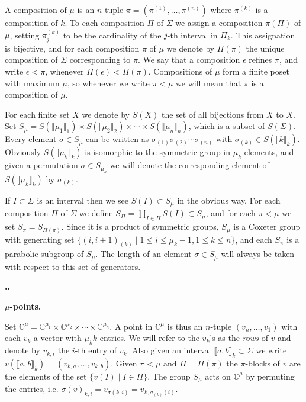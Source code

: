 \documentclass[11pt,fleqn]{amsart}
\renewcommand\thesection{\arabic{section}}
\newcounter{para}[section]
\renewcommand\thepara{\thesection.\arabic{para}}
\def\paragraph{%
 \noindent
 \refstepcounter{para}%
 \textbf{\thepara.}\hspace{1ex}%
}
\newcommand\about[1]{%
 {\bfseries#1.}%
}
\newcommand\CC{\mathbb C}
\newcommand\interval[1]{\llbracket #1 \rrbracket}
\begin{document}
A composition of $\mu$ is an $n$-tuple $\pi = (\pi^{(1)}, \ldots, 
\pi^{(n)})$ where $\pi^{(k)}$ is a composition of $k$. To each
composition $\Pi$ of $\Sigma$ we assign a composition $\pi(\Pi)$ of $\mu$, 
setting $\pi^{(k)}_j$ to be the cardinality of the $j$-th interval in $\Pi_k$. 
This assignation is bijective, and for each composition $\pi$ of $\mu$ we 
denote by $\Pi(\pi)$ the unique composition of $\Sigma$ corresponding to 
$\pi$. We say that a composition $\epsilon$ refines $\pi$, and write 
$\epsilon < \pi$, whenever $\Pi(\epsilon) < \Pi(\pi)$. Compositions of $\mu$ 
form a finite poset with maximum $\mu$, so whenever we write $\pi < \mu$ we 
will mean that $\pi$ is a composition of $\mu$.

For each finite set $X$ we denote by $S(X)$ the set of all bijections from
$X$ to $X$. Set $S_\mu = S(\interval{\mu_1}_1) \times S(\interval{\mu_2}_{2}) 
\times \cdots \times S(\interval{\mu_n}_n)$, which is a subset of $S(\Sigma)$. 
Every element $\sigma \in S_\mu$ can be written as $\sigma_{(1)} \sigma_{(2)}
\cdots \sigma_{(n)}$ with $\sigma_{(k)} \in S(\interval{k}_k)$. Obviously
$S(\interval{\mu_k}_k)$ is isomorphic to the symmetric group in $\mu_k$ 
elements, and given a permutation $\sigma \in S_{\mu_k}$ we will denote the 
corresponding element of $S(\interval{\mu_k}_k)$ by $\sigma_{(k)}$. 

If $I \subset \Sigma$ is an interval then we see $S(I) \subset S_\mu$ in the 
obvious way. For each composition $\Pi$ of $\Sigma$ we define $S_\Pi = 
\prod_{I \in \Pi} S(I) \subset S_\mu$, and for each $\pi < \mu$ we set $S_\pi 
= S_{\Pi(\pi)}$. Since it is a product of symmetric groups, $S_\mu$ is a 
Coxeter group with generating set $\{(i,i+1)_{(k)} \mid 1 \leq i \leq \mu_k-1, 
1 \leq k \leq n\}$, and each $S_\pi$ is a parabolic subgroup of $S_\mu$. The
length of an element $\sigma \in S_\mu$ will always be taken with respect to
this set of generators.

\paragraph
\about{$\mu$-points}
\label{mu-points}
Set $\CC^\mu = \CC^{\mu_1} \times \CC^{\mu_2} \times \cdots \times 
\CC^{\mu_n}$. A point in $\CC^\mu$ is thus an $n$-tuple $(v_n, \ldots, v_1)$ 
with each $v_k$ a vector with $\mu_kk$ entries. We will refer to the $v_k$'s 
as the \emph{rows} of $v$ and denote by $v_{k,i}$ the $i$-th entry of $v_k$. 
Also given an interval $\interval{a,b}_k \subset \Sigma$ we write 
$v(\interval{a,b}_k) = (v_{k,a},\ldots, v_{k,b})$. Given $\pi < \mu$ and $\Pi 
= \Pi(\pi)$ the $\pi$-blocks of $v$ are the elements of the set $\{v(I) \mid 
I \in \Pi\}$. The group $S_\mu$ acts on $\CC^\mu$ by permuting the entries, 
i.e. $\sigma(v)_{k,i} = v_{\sigma(k,i)} = v_{k,\sigma_{(k)}(i)}$. 
\end{document}
